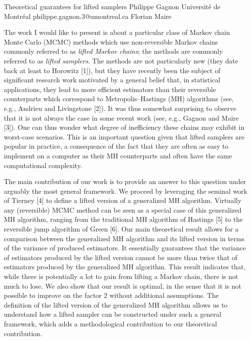 \begin{talk}
  {Theoretical guarantees for lifted samplers}%
  {Philippe Gagnon}%
  {Universit\'e de Montr\'eal}%
  {philippe.gagnon.3@umontreal.ca}%
  {Florian Maire}%
  {}%
    
   
The work I would like to present is about a particular class of Markov chain Monte Carlo (MCMC) methods which use non-reversible Markov chains commonly referred to as \textit{lifted Markov chains}; the methods are commonly referred to as \textit{lifted samplers}. The methods are not particularly new (they date back at least to Horowitz [1]), but they have recently been the subject of significant research work motivated by a general belief that, in statistical applications, they lead to more efficient estimators than their reversible counterparts which correspond to Metropolis--Hastings (MH) algorithms (see, e.g., Andrieu and Livingstone [2]). It was thus somewhat surprising to observe that it is not always the case in some recent work (see, e.g., Gagnon and Maire [3]). One can thus wonder what degree of inefficiency these chains may exhibit in worst-case scenarios. This is an important question given that lifted samplers are popular in practice, a consequence of the fact that they are often as easy to implement on a computer as their MH counterparts and often have the same computational complexity.

The main contribution of our work is to provide an answer to this question under arguably the most general framework. We proceed by leveraging the seminal work of Tierney [4] to define a lifted version of a generalized MH algorithm. Virtually any (reversible) MCMC method can be seen as a special case of this generalized MH algorithm, ranging from the traditional MH algorithm of Hastings [5] to the reversible jump algorithm of Green [6]. Our main theoretical result allows for a comparison between the generalized MH algorithm and its lifted version in terms of the variance of produced estimators. It essentially guarantees that the variance of estimators produced by the lifted version cannot be more than twice that of estimators produced by the generalized MH algorithm. This result indicates that, while there is potentially a lot to gain from lifting a Markov chain, there is not much to lose. We also show that our result is optimal, in the sense that it is not possible to improve on the factor 2 without additional assumptions. The definition of the lifted version of the generalized MH algorithm allows us to understand how a lifted sampler can be constructed under such a general framework, which adds a methodological contribution to our theoretical contribution.


\end{talk}
